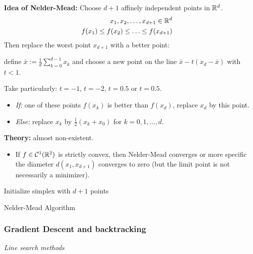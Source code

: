\textbf{Idea of Nelder-Mead:}
Choose  \(d+1\) affinely independent points in  \(\mathbb{R}^d\).
\begin{align*}
  x_1, x_2, \ldots, x_{d+1} \in \mathbb{R}^d \\
  f(x_1) \leq f(x_2) \leq \ldots \leq f(x_{d+1})
\end{align*}
Then replace the worst point  \(x_{d+1}\) with a better point:

define  \(\bar{x} := \frac{1}{d} \sum_{k=0}^{d-1} x_k\) and choose a new point on the line  \(\bar{x} - t(x_{d} - \bar{x})\) with  \(t < 1\).

Take particularly:  \(t= -1\),  \(t = -2\),  \(t = 0.5\) or  \(t = 0.5\).

\begin{itemize}
  \item \textit{If:} one of these points  \(f(x_k)\) is better than  \(f(x_{d})\), replace  \(x_{d}\) by this point.
  \item \textit{Else:} replace  \(x_k\) by  \(\frac{1}{2}(x_k + x_0)\) for  \(k = 0, 1, \ldots, d\).
\end{itemize}

\textbf{Theory:} almost non-existent.
\begin{itemize}
  \item If  \(f \in \mathcal{C}^1(\mathbb{R}^2)\) is strictly convex, then Nelder-Mead converges or more specific the diameter  \(d(x_1, x_{d+1})\) converges to zero (but the limit point is not necessarily a minimizer).
\end{itemize}

\begin{algorithm}[H]
  \SetAlgoLined
  Initialize simplex with  \(d+1\) points\;
  \;
  \caption{Nelder-Mead Algorithm}
\end{algorithm}

\subsubsection*{Gradient Descent and backtracking}
\vspace{-0.1cm}
\textit{Line search methods}

